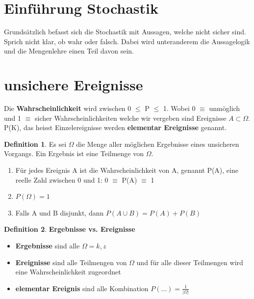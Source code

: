 \documentclass[a4paper]{article}
\theoremstyle{definition}
\newtheorem{definition}{Definition}
\theoremstyle{example}
\begin{document}



\section{Einführung Stochastik}
Grundsätzlich befasst sich die Stochastik mit Aussagen, welche nicht sicher sind. Sprich nicht klar, ob wahr oder falsch. Dabei wird unteranderem die Aussagelogik und die Mengenlehre einen Teil davon sein.


\section{unsichere Ereignisse}

Die \textbf{Wahrscheinlichkeit} wird zwischen 0 $\leq$ P $\leq$ 1. Wobei 0 $\equiv$ unmöglich und 1 $\equiv$ sicher
Wahrscheinlichkeiten welche wir vergeben sind Ereignisse $A \subset \Omega$. 
P({K}), das heisst Einzelereignisse werden \textbf{elementar Ereignisse} genannt.

\theoremstyle{definition}
\begin{tcolorbox}
\begin{definition}
Es sei $\Omega$ die Menge aller möglichen Ergebnisse eines unsicheren Vorgangs. Ein Ergebnis ist eine Teilmenge von $\Omega$.
\begin{enumerate}
\item{Für jedes Ereignis A ist die Wahrscheinlichkeit von A, genannt P(A), eine reelle Zahl zwischen 0 und 1: 0 $\equiv$ P(A) $\equiv$ 1}
\item{$P(\Omega)=1$}
\item{Falls A und B disjunkt, dann $P(A \cup B) = P(A) + P(B)$}
\end{enumerate}
\end{definition}
\end{tcolorbox}

\theoremstyle{definition}
\begin{tcolorbox}
\begin{definition}
\textbf{Ergebnisse vs. Ereignisse}
\begin{itemize}
\item \textbf{Ergebnisse} sind alle $\Omega = {k,z}$
\item \textbf{Ereignisse} sind alle Teilmengen von $\Omega$ und für alle dieser Teilmengen wird eine Wahrscheinlichkeit zugeordnet
\item \textbf{elementar Ereignis} sind alle Kombination $P({...}) = \frac{1}{|\Omega|}$
\end{itemize}
\end{definition}
\end{tcolorbox}
\end{document}
